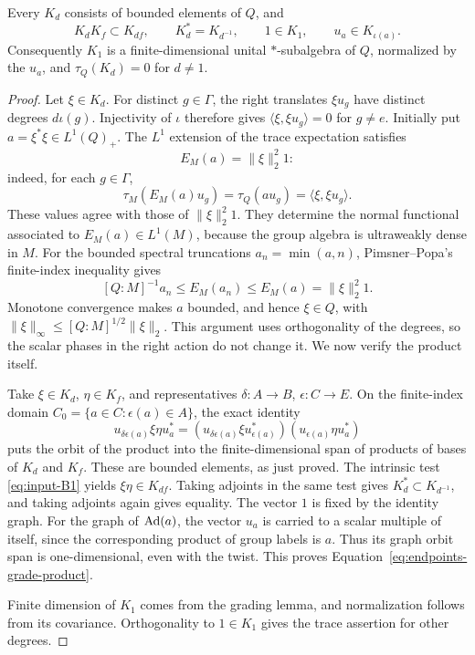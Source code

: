 \begin{lemma}
\label{lem:endpoints-bounded-grades}
Every \(K_d\) consists of bounded elements of \(Q\), and
\begin{equation}
 K_dK_f\subset K_{df},\qquad K_d^*=K_{d^{-1}},\qquad
 1\in K_1,\qquad u_a\in K_{\iota(a)}.
 \label{eq:endpoints-grade-product}
\end{equation}
Consequently \(K_1\) is a finite-dimensional unital \(*\)-subalgebra
of \(Q\), normalized by the \(u_a\), and \(\tau_Q(K_d)=0\) for
\(d\ne1\).
\end{lemma}

\begin{proof}
Let $\xi\in K_d$. For distinct $g\in\Gamma$, the right translates
$\xi u_g$ have distinct degrees $d\iota(g)$. Injectivity of $\iota$
therefore gives $\langle\xi,\xi u_g\rangle=0$ for $g\ne e$.
Initially put $a=\xi^*\xi\in L^1(Q)_+$. The $L^1$ extension of the
trace expectation satisfies
\[
 E_M(a)=\|\xi\|_2^2 1:
\]
indeed, for each $g\in\Gamma$,
\[
 \tau_M(E_M(a)u_g)=\tau_Q(a u_g)=\langle\xi,\xi u_g\rangle.
\]
These values agree with those of $\|\xi\|_2^2 1$. They determine
the normal functional associated to $E_M(a)\in L^1(M)$, because the
group algebra is ultraweakly dense in $M$. For the bounded spectral
truncations $a_n=\min(a,n)$,
Pimsner--Popa's finite-index inequality
\cite[Proposition~2.1]{PimsnerPopa1986} gives
\[
 [Q:M]^{-1}a_n\leq E_M(a_n)\leq E_M(a)=\|\xi\|_2^2 1.
\]
Monotone convergence makes $a$ bounded, and hence $\xi\in Q$, with
$\|\xi\|_\infty\leq[Q:M]^{1/2}\|\xi\|_2$. This argument uses
orthogonality of the degrees, so the scalar phases in the right action
do not change it. We now verify the product itself.

Take \(\xi\in K_d\), \(\eta\in K_f\), and representatives
\(\delta:A\to B\), \(\epsilon:C\to E\).  On the finite-index
domain \(C_0=\{a\in C:\epsilon(a)\in A\}\), the exact identity
\[
 u_{\delta\epsilon(a)}\xi\eta u_a^*
   =(u_{\delta\epsilon(a)}\xi u_{\epsilon(a)}^*)
      (u_{\epsilon(a)}\eta u_a^*)
\]
puts the orbit of the product into the finite-dimensional span of
products of bases of \(K_d\) and \(K_f\).
These are bounded elements, as just proved.  The intrinsic test
\eqref{eq:input-B1} yields \(\xi\eta\in K_{df}\).
Taking adjoints in the same test gives
\(K_d^*\subset K_{d^{-1}}\), and taking adjoints again gives equality.
The vector \(1\) is fixed by the identity graph.  For the graph of
\(\operatorname{Ad}(a)\), the vector \(u_a\) is carried to a scalar multiple of
itself, since the corresponding product of group labels is \(a\).
Thus its graph orbit span is one-dimensional, even with the twist.
This proves Equation~\eqref{eq:endpoints-grade-product}.

Finite dimension of \(K_1\) comes from the grading lemma, and
normalization follows from its covariance.  Orthogonality to
\(1\in K_1\) gives the trace assertion for other degrees.
\end{proof}

